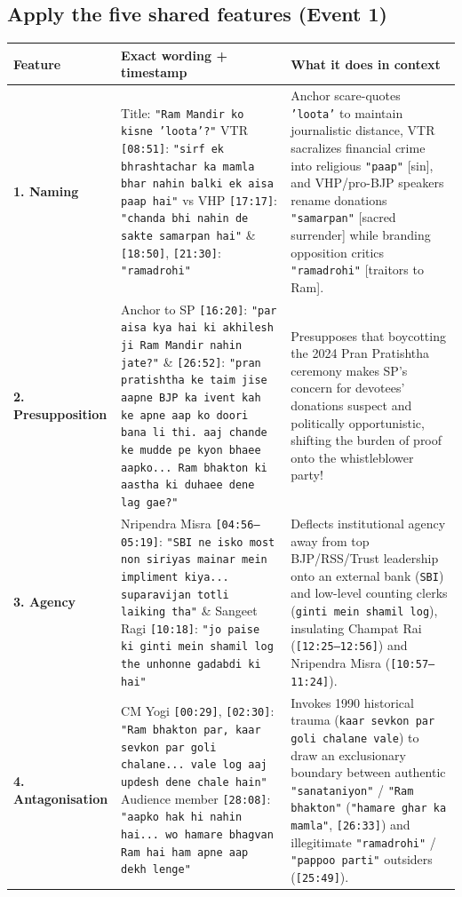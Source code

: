 \documentclass[10pt,a4paper]{article}
\begin{document}
\subsection*{Apply the five shared features (Event 1)}
\begin{longtable}{@{}>{\raggedright\arraybackslash}p{} >{\raggedright\arraybackslash}p{} >{\raggedright\arraybackslash}p{}@{}}
\toprule
\textbf{Feature} & \textbf{Exact wording + timestamp} & \textbf{What it does in context} \\
\midrule
\endhead
\textbf{1. Naming} & Title: \texttt{"Ram Mandir ko kisne 'loota'?"} \newline  VTR \texttt{[08:51]}: \texttt{"sirf ek bhrashtachar ka mamla bhar nahin balki ek aisa paap hai"} vs VHP \texttt{[17:17]}: \texttt{"chanda bhi nahin de sakte samarpan hai"} \& \texttt{[18:50]}, \texttt{[21:30]}: \texttt{"ramadrohi"} & Anchor scare-quotes \texttt{'loota'} to maintain journalistic distance, VTR sacralizes financial crime into religious \texttt{"paap"} [sin], and VHP/pro-BJP speakers rename donations \texttt{"samarpan"} [sacred surrender] while branding opposition critics \texttt{"ramadrohi"} [traitors to Ram]. \\
\addlinespace[4pt]
\textbf{2. Presupposition} & Anchor to SP \texttt{[16:20]}: \texttt{"par aisa kya hai ki akhilesh ji Ram Mandir nahin jate?"} \& \texttt{[26:52]}: \texttt{"pran pratishtha ke taim jise aapne BJP ka ivent kah ke apne aap ko doori bana li thi. aaj chande ke mudde pe kyon bhaee aapko... Ram bhakton ki aastha ki duhaee dene lag gae?"} & Presupposes that boycotting the 2024 Pran Pratishtha ceremony makes SP's concern for devotees' donations suspect and politically opportunistic, shifting the burden of proof onto the whistleblower party! \\
\addlinespace[4pt]
\textbf{3. Agency} & Nripendra Misra \texttt{[04:56--05:19]}: \texttt{"SBI ne isko most non siriyas mainar mein impliment kiya... suparavijan totli laiking tha"} \& Sangeet Ragi \texttt{[10:18]}: \texttt{"jo paise ki ginti mein shamil log the unhonne gadabdi ki hai"} & Deflects institutional agency away from top BJP/RSS/Trust leadership onto an external bank (\texttt{SBI}) and low-level counting clerks (\texttt{ginti mein shamil log}), insulating Champat Rai (\texttt{[12:25--12:56]}) and Nripendra Misra (\texttt{[10:57--11:24]}). \\
\addlinespace[4pt]
\textbf{4. Antagonisation} & CM Yogi \texttt{[00:29]}, \texttt{[02:30]}: \texttt{"Ram bhakton par, kaar sevkon par goli chalane... vale log aaj updesh dene chale hain"} \newline  Audience member \texttt{[28:08]}: \texttt{"aapko hak hi nahin hai... wo hamare bhagvan Ram hai ham apne aap dekh lenge"} & Invokes 1990 historical trauma (\texttt{kaar sevkon par goli chalane vale}) to draw an exclusionary boundary between authentic \texttt{"sanataniyon"} / \texttt{"Ram bhakton"} (\texttt{"hamare ghar ka mamla"}, \texttt{[26:33]}) and illegitimate \texttt{"ramadrohi"} / \texttt{"pappoo parti"} outsiders (\texttt{[25:49]}). \\

\end{longtable}
\end{document}
